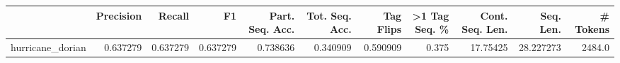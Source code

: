 \begin{tabular}{lrrrrrrrrrr}
\toprule
{} &  Precision &    Recall &        F1 &  Part. Seq. Acc. &  Tot. Seq. Acc. &  Tag Flips &  >1 Tag Seq. \% &  Cont. Seq. Len. &  Seq. Len. &  \# Tokens \\
\midrule
hurricane\_dorian &   0.637279 &  0.637279 &  0.637279 &         0.738636 &        0.340909 &   0.590909 &          0.375 &         17.75425 &  28.227273 &    2484.0 \\
\bottomrule
\end{tabular}
